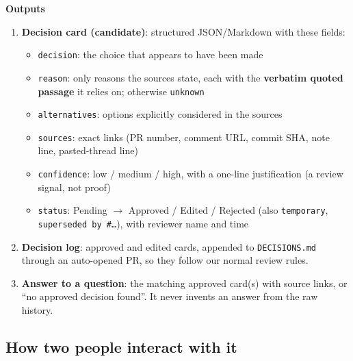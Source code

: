 \documentclass[11pt,a4paper]{article}
\newcommand{\code}[1]{\texttt{#1}}
\newcommand{\ra}{$\rightarrow$}
\begin{document}
\textbf{Outputs}
\begin{enumerate}
  \item \textbf{Decision card (candidate)}: structured JSON/Markdown with these fields:
  \begin{itemize}
    \item \code{decision}: the choice that appears to have been made
    \item \code{reason}: only reasons the sources state, each with the \textbf{verbatim quoted passage} it relies on; otherwise \code{unknown}
    \item \code{alternatives}: options explicitly considered in the sources
    \item \code{sources}: exact links (PR number, comment URL, commit SHA, note line, pasted-thread line)
    \item \code{confidence}: low / medium / high, with a one-line justification (a review signal, not proof)
    \item \code{status}: Pending \ra{} Approved / Edited / Rejected (also \code{temporary}, \code{superseded by \#\ldots}), with reviewer name and time
  \end{itemize}
  \item \textbf{Decision log}: approved and edited cards, appended to \code{DECISIONS.md} through an auto-opened PR, so they follow our normal review rules.
  \item \textbf{Answer to a question}: the matching approved card(s) with source links, or ``no approved decision found''. It never invents an answer from the raw history.
\end{enumerate}

\subsection{How two people interact with it}
\end{document}
